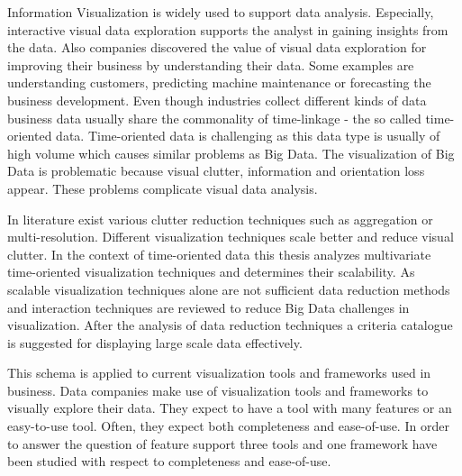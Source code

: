 \documentclass[oneside]{pi4-thesis}
\date{\today}
\begin{document}

\afterpage{\null\newpage}

\abstractchap
Information Visualization is widely used to support data analysis. Especially, interactive visual data exploration supports the analyst in gaining insights from the data. Also companies discovered the value of visual data exploration for improving their business by understanding their data. Some examples are understanding customers, predicting machine maintenance or forecasting the business development. Even though industries collect different kinds of data business data usually share the commonality of time-linkage - the so called time-oriented data. Time-oriented data is challenging as this data type is usually of high volume which causes similar problems as Big Data. The visualization of Big Data is problematic because visual clutter, information and orientation loss appear. These problems complicate visual data analysis. 
\par
In literature exist various clutter reduction techniques such as aggregation or multi-resolution. Different visualization techniques scale better and reduce visual clutter. In the context of time-oriented data this thesis analyzes multivariate time-oriented visualization techniques and determines their scalability. As scalable visualization techniques alone are not sufficient data reduction methods and interaction techniques are reviewed to reduce Big Data challenges in visualization. After the analysis of data reduction techniques a criteria catalogue is suggested for displaying large scale data effectively. 
\par
This schema is applied to current visualization tools and frameworks used in business. Data companies make use of visualization tools and frameworks to visually explore their data. They expect to have a tool with many features or an easy-to-use tool. Often, they expect both completeness and ease-of-use.  In order to answer the question of feature support three tools and one framework have been studied with respect to completeness and ease-of-use. 
\end{document}
